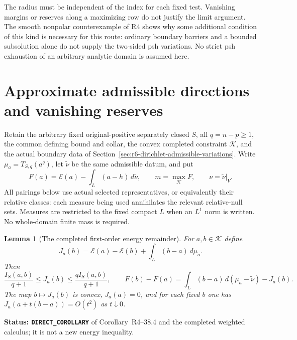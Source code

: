 \documentclass[11pt,a4paper]{article}
\numberwithin{equation}{section}
\newtheorem{lemma}[theorem]{Lemma}
\theoremstyle{definition}
\theoremstyle{remark}
\begin{document}
The radius must be independent of the index for each fixed test.
Vanishing margins or reserves along a maximizing row do not justify the
limit argument. The smooth nonpolar counterexample of R4 shows why some
additional condition of this kind is necessary for this route: ordinary
boundary barriers and a bounded subsolution alone do not supply the
two-sided psh variations. No strict psh exhaustion of an arbitrary
analytic domain is assumed here.



\section{Approximate admissible directions and vanishing reserves}
\label{sec:r6-approximate-dirichlet-variations}

Retain the arbitrary fixed original-positive separately closed $S$, all
$q=n-p\ge1$, the common defining bound and collar, the convex completed
constraint $\mathscr K$, and the actual boundary data of
Section~\ref{sec:r6-dirichlet-admissible-variations}. Write
$\mu_a=T_{S,q}(a^q)$, let $\widetilde\nu$ be the same admissible datum,
and put
\[
 F(a)=\mathcal E(a)-\int_L(a-h)\,d\widetilde\nu,
 \qquad m=\max_{\mathscr K}F,
 \qquad \nu=\widetilde\nu|_V.
\]
All pairings below use actual selected representatives, or equivalently
their relative classes: each measure being used annihilates the relevant
relative-null sets. Measures are restricted to the fixed compact $L$
when an $L^1$ norm is written. No whole-domain finite mass is required.

\begin{lemma}[The completed first-order energy remainder]
\label{lem:r6-completed-energy-remainder}
For $a,b\in\mathscr K$ define
\[
 J_a(b)=\mathcal E(a)-\mathcal E(b)
                         +\int_L(b-a)\,d\mu_a.
\]
Then
\begin{equation}
 \frac{I_S(a,b)}{q+1}\le J_a(b)
                       \le\frac{qI_S(a,b)}{q+1},
 \qquad
 F(b)-F(a)=\int_L(b-a)\,d(\mu_a-\widetilde\nu)-J_a(b).
 \label{eq:r6-energy-remainder-identity}
\end{equation}
The map $b\mapsto J_a(b)$ is convex, $J_a(a)=0$, and for each fixed
$b$ one has $J_a(a+t(b-a))=O(t^2)$ as $t\downarrow0$.
\end{lemma}

\noindent\textbf{Status: \texttt{DIRECT\_COROLLARY}} of
Corollary~\textup{R4--38.4} and the completed weighted
calculus; it is not a new energy inequality.
\end{document}
